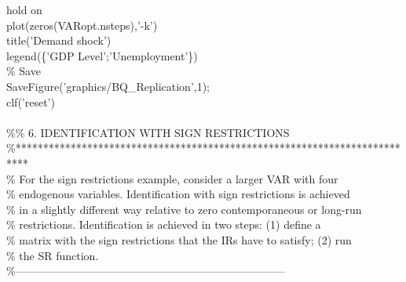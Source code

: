 \hspace{1mm}hold on \\ 
\hspace{1mm}plot(zeros(VARopt.nsteps),\textcolor{matlabpurple}{'-k'}) \\ 
\hspace{1mm}title(\textcolor{matlabpurple}{'Demand shock'}) \\ 
\hspace{1mm}legend(\{\textcolor{matlabpurple}{'GDP Level'};'Unemployment'\}) \\ 
\hspace{1mm}\textcolor{matlabgreen}{\% Save }\\ 
\hspace{1mm}SaveFigure(\textcolor{matlabpurple}{'graphics/BQ\_Replication'},1); \\ 
\hspace{1mm}clf(\textcolor{matlabpurple}{'reset'}) \\ 
\hspace{1mm} \\ 
\hspace{1mm}\textcolor{matlabgreen}{\%}\textcolor{matlabgreen}{\% 6. IDENTIFICATION WITH SIGN RESTRICTIONS }\\ 
\hspace{1mm}\textcolor{matlabgreen}{\%**************************************************************************  }\\ 
\hspace{1mm}\textcolor{matlabgreen}{\% For the sign restrictions example, consider a larger VAR  with four  }\\ 
\hspace{1mm}\textcolor{matlabgreen}{\% endogenous variables. Identification with sign restrictions is achieved  }\\ 
\hspace{1mm}\textcolor{matlabgreen}{\% in a slightly different way relative to zero contemporaneous or long-run  }\\ 
\hspace{1mm}\textcolor{matlabgreen}{\% restrictions. Identification is achieved in two steps: (1) define a  }\\ 
\hspace{1mm}\textcolor{matlabgreen}{\% matrix with the sign restrictions that the IRs have to satisfy; (2) run  }\\ 
\hspace{1mm}\textcolor{matlabgreen}{\% the SR function.  }\\ 
\hspace{1mm}\textcolor{matlabgreen}{\%--------------------------------------------------------------------------  }\\ 
